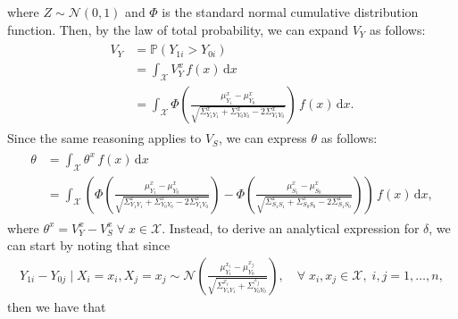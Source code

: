 \documentclass[12pt]{article}
\newcommand{\Prob}{\mathbb{P}}
\begin{document}
where \(Z \sim \mathcal{N}(0,1)\) and \(\Phi\) is the standard normal cumulative distribution function. Then, by the law of total probability, we can expand \(V_{Y}\) as follows:
\begin{align}
    \begin{split}
        V_{Y} & = \Prob \left( Y_{1i} > Y_{0i} \right) \\
        & = \int_{\mathcal{X}} V^{x}_{Y} \, f (x) \, \text{d}x \\
        & = \int_{\mathcal{X}} \Phi \left( \frac{ \mu^{x}_{Y_{1}} - \mu^{x}_{Y_{0}}}{\sqrt{\Sigma^{x}_{Y_{1} Y_{1}} + \Sigma^{x}_{Y_{0} Y_{0}} - 2 \Sigma^{x}_{Y_{1} Y_{0}}}} \right) \, f (x) \, \text{d}x.
    \end{split}
\end{align}
Since the same reasoning applies to \(V_{S}\), we can express \(\theta\) as follows:
\begin{align}
\label{eq:decomposition_theta}
    \begin{split}
        \theta & = \int_{\mathcal{X}} \theta^{x} \, f (x) \, \text{d}x \\
        & = \int_{\mathcal{X}} \left( \Phi \left( \frac{ \mu^{x}_{Y_{1}} - \mu^{x}_{Y_{0}}}{\sqrt{\Sigma^{x}_{Y_{1} Y_{1}} + \Sigma^{x}_{Y_{0} Y_{0}} - 2 \Sigma^{x}_{Y_{1} Y_{0}}}} \right) - \Phi \left( \frac{ \mu^{x}_{S_{1}} - \mu^{x}_{S_{0}}}{\sqrt{\Sigma^{x}_{S_{1} S_{1}} + \Sigma^{x}_{S_{0} S_{0}} - 2 \Sigma^{x}_{S_{1} S_{0}}}} \right) \right) \, f (x) \, \text{d}x,
    \end{split}
\end{align}
where \( \theta^{x} = V^{x}_{Y} - V^{x}_{S} \; \forall \; x \in \mathcal{X}\). Instead, to derive an analytical expression for \(\delta\), we can start by noting that since
\begin{align}
    Y_{1i} - Y_{0j} \mid X_{i} = x_{i}, X_{j} = x_{j} \sim \mathcal{N} \left( \frac{\mu^{x_{i}}_{Y_{1}} - \mu^{x_{j}}_{Y_{0}}}{\sqrt{\Sigma^{x_{i}}_{Y_{1} Y_{1}} + \Sigma^{x_{j}}_{Y_{0} Y_{0}}}} \right), \quad \forall \; x_{i}, x_{j} \in \mathcal{X}, \; i,j = 1, \ldots, n,
\end{align}
then we have that
\end{document}

